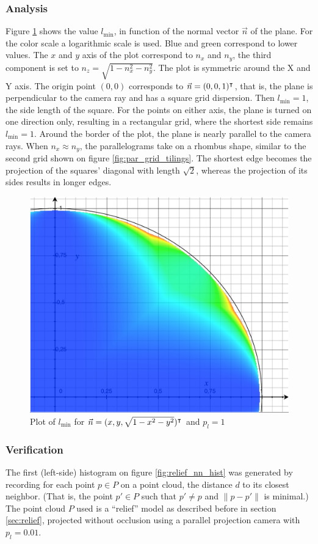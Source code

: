\subsubsection{Analysis}
Figure \ref{fig:lmin_plot} shows the value $l_{\text{min}}$, in function of the normal vector $\vec{n}$ of the plane. For the color scale a logarithmic scale is used. Blue and green correspond to lower values. The $x$ and $y$ axis of the plot correspond to $n_x$ and $n_y$, the third component is set to $n_z = \sqrt{1 - n^2_x - n^2_y}$. The plot is symmetric around the X and Y axis. The origin point $(0, 0)$ corresponds to $\vec{n} = (0, 0, 1)^\intercal$, that is, the plane is perpendicular to the camera ray and has a square grid dispersion. Then $l_{\text{min}} = 1$, the side length of the square. For the points on either axis, the plane is turned on one direction only, resulting in a rectangular grid, where the shortest side remains $l_{\text{min}} = 1$. Around the border of the plot, the plane is nearly parallel to the camera rays. When $n_x \approx n_y$, the parallelograms take on a rhombus shape, similar to the second grid shown on figure \ref{fig:par_grid_tilings}. The shortest edge becomes the projection of the squares' diagonal with length $\sqrt{2}$, whereas the projection of its sides results in longer edges.

\begin{figure}[p]
\centering
\includegraphics[width=.4\textwidth]{fig/lmin_plot.pdf}
\caption{Plot of $l_{\text{min}}$ for $\vec{n} = (x, y, \sqrt{1 - x^2 - y^2})^\intercal$ and $p_l = 1$}
\label{fig:lmin_plot}
\end{figure}


\subsubsection{Verification}
The first (left-side) histogram on figure \ref{fig:relief_nn_hist} was generated by recording for each point $p \in P$ on a point cloud, the distance $d$ to its closest neighbor. (That is, the point $p' \in P$ such that $p' \neq p$ and $\| p - p' \|$ is minimal.) The point cloud $P$ used is a ``relief'' model as described before in section \ref{sec:relief}, projected without occlusion using a parallel projection camera with $p_l = 0.01$.

